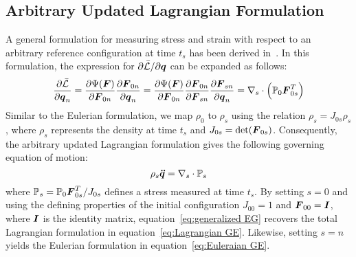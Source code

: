 \subsection{Arbitrary Updated Lagrangian Formulation}
\label{sec:arbitrary-updated-lagrangian}

A general formulation for measuring stress and strain with respect to an arbitrary reference configuration at time $t_s$ has been derived in~\cite{Zienkiewicz:1977:FEM, Shabana:2018:computational}. In this formulation, the expression for ${\partial \bar{\mathcal{L}}}/{\partial \boldsymbol{q}}$ can be expanded as follows:
\begin{eqnarray}
\frac{\partial \bar{\mathcal{L}}}{\partial \boldsymbol{q}_n}=
\frac{\partial\Psi(\boldsymbol{F})}{\partial\boldsymbol{F}_{0n}}\frac{\partial \boldsymbol{F}_{0n}}{\partial \boldsymbol{q}_n}=
\frac{\partial\Psi(\boldsymbol{F})}{\partial\boldsymbol{F}_{0n}}\frac{\partial \boldsymbol{F}_{0n}}{\partial \boldsymbol{F}_{sn}}\frac{\partial \boldsymbol{F}_{sn}}{\partial \boldsymbol{q}_n}=\nabla_s\cdot\left(\mathbb{P}_0\boldsymbol{F}_{0s}^T\right)
\label{eq:AUL}
\end{eqnarray}
Similar to the Eulerian formulation, we map $\rho_0$ to $\rho_s$ using the relation $\rho_s=J_{0s}\rho_s$, where $\rho_s$ represents the density at time $t_s$ and $J_{0s}=\text{det}(\boldsymbol{F}_{0s})$. Consequently, the arbitrary updated Lagrangian formulation gives the following governing equation of motion:
\begin{equation}
    \rho_s\bs{\ddot{q}}=\nabla_s\cdot\mathbb{P}_s%
    \label{eq:generalized EG}
\end{equation}
where $\mathbb{P}_s=\mathbb{P}_0\boldsymbol{F}_{0s}^T/{J_{0s}}$ defines a stress measured at time $t_s$. 
By setting $s=0$ and using the defining properties of the initial configuration $J_{00}=1$ and $\boldsymbol{F}_{00}=\boldsymbol{I}$, where $\boldsymbol{I}$ is the identity matrix, equation~\eqref{eq:generalized EG} recovers the total Lagrangian formulation in equation~\eqref{eq:Lagrangian GE}. Likewise, setting $s=n$ yields the Eulerian formulation in equation~\eqref{eq:Euleraian GE}. 



